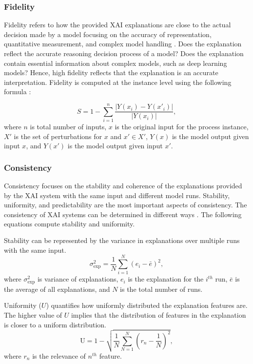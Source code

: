 \documentclass[final,5p,times,twocolumn]{elsarticle}
\begin{document}
\subsubsection{Fidelity}
Fidelity refers to how the provided XAI explanations are close to the actual decision made by a model focusing on the accuracy of representation, quantitative measurement, and complex model handling \cite{markus2021role}. Does the explanation reflect the accurate reasoning decision process of a model? Does the explanation contain essential information about complex models, such as deep learning models? Hence, high fidelity reflects that the explanation is an accurate interpretation. Fidelity is computed at the instance level using the following formula \cite{velmurugan2021developing}:

\begin{equation}
S = 1 - \sum_{i=1}^{n} \frac{\left| Y(x_i) - Y(x'_i) \right|}{\left| Y(x_i) \right|},
\end{equation}
where $n$ is total number of inputs, \( x \) is the original input for the process instance, \( X' \) is the set of perturbations for \( x \) and \( x' \in X' \), \( Y(x) \) is the model output given input \( x \), and \( Y(x') \) is the model output given input \( x' \).

\subsubsection{Consistency}
Consistency focuses on the stability and coherence of the explanations provided by the XAI system with the same input and different model runs. Stability, uniformity, and predictability are the most important aspects of consistency. The consistency of XAI systems can be determined in different ways \cite{sun2015stability}. The following equations compute stability and uniformity.

Stability can be represented by the variance in explanations over multiple runs with the same input.
\begin{equation}
\sigma^2_{\text{exp}} = \frac{1}{N}\sum_{i=1}^{N} (e_i - \bar{e})^2,
\end{equation}
where \( \sigma^2_{\text{exp}} \) is variance of explanations, \( e_i \) is the explanation for the $i^{th}$ run, \( \bar{e} \) is the average of all explanations, and \( N \) is the total number of runs.

Uniformity ($U$) quantifies how uniformly distributed the explanation features are. The higher value of $U$ implies that the distribution of features in the explanation is closer to a uniform distribution.
\begin{equation}
\text{U} = 1 - \sqrt{\frac{1}{N}\sum_{N=1}^{N} \left(r_n - \frac{1}{N}\right)^2},
\end{equation}
where $r_n$ is the relevance of $n^{th}$ feature.
\end{document}
